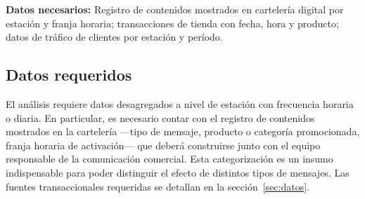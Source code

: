 \textbf{Datos necesarios:} Registro de contenidos mostrados en cartelería digital 
por estación y franja horaria; transacciones de tienda con fecha, hora y producto; 
datos de tráfico de clientes por estación y período.



\subsection{Datos requeridos}

El análisis requiere datos desagregados a nivel de estación con frecuencia horaria 
o diaria. En particular, es necesario contar con el registro de contenidos mostrados 
en la cartelería —tipo de mensaje, producto o categoría promocionada, franja horaria 
de activación— que deberá construirse junto con el equipo responsable de la 
comunicación comercial. Esta categorización es un insumo indispensable para poder 
distinguir el efecto de distintos tipos de mensajes. Las fuentes transaccionales 
requeridas se detallan en la sección~\ref{sec:datos}.

